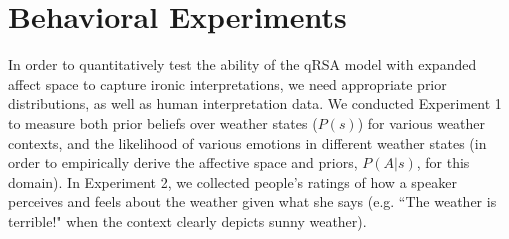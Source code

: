 \documentclass[10pt,letterpaper]{article}
\begin{document}



\section{Behavioral Experiments}
In order to quantitatively test the ability of the qRSA model with expanded affect space to capture ironic interpretations, we need appropriate prior distributions, as well as human interpretation data.
We conducted Experiment 1 to measure both prior beliefs over weather states ($P(s)$) for various weather contexts, and the likelihood of various emotions in different weather states (in order to empirically derive the affective space and priors, $P(A | s)$, for this domain).
In Experiment 2, we collected people's ratings of how a speaker perceives and feels about the weather given what she says (e.g. ``The weather is terrible!" when the context clearly depicts sunny weather).
\end{document}
